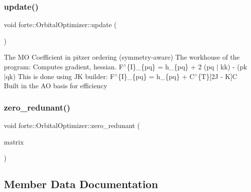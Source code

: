 \mbox{\label{classforte_1_1_orbital_optimizer_a575a256f93d9c3ca9d8eb388a9f51f79}} 
\subsubsection{\texorpdfstring{update()}{update()}}
{\footnotesize\ttfamily void forte\+::\+Orbital\+Optimizer\+::update (\begin{DoxyParamCaption}{ }\end{DoxyParamCaption})}

The MO Coefficient in pitzer ordering (symmetry-\/aware) The workhouse of the program\+: Computes gradient, hessian. F$^\wedge$\{I\}\+\_\+\{pq\} = h\+\_\+\{pq\} + 2 (pq $\vert$ kk) -\/ (pk $\vert$qk) This is done using JK builder\+: F$^\wedge$\{I\}\+\_\+\{pq\} = h\+\_\+\{pq\} + C$^\wedge$\{T\}\mbox{[}2J -\/ K\mbox{]}C Built in the AO basis for efficiency \mbox{\label{classforte_1_1_orbital_optimizer_a7f79e499361da4bc0d4b90187033d38f}} 
\subsubsection{\texorpdfstring{zero\+\_\+redunant()}{zero\_redunant()}}
{\footnotesize\ttfamily void forte\+::\+Orbital\+Optimizer\+::zero\+\_\+redunant (\begin{DoxyParamCaption}\item[{psi\+::\+Shared\+Matrix \&}]{matrix }\end{DoxyParamCaption})\hspace{0.3cm}{\ttfamily [protected]}}



\subsection{Member Data Documentation}
\mbox{\label{classforte_1_1_orbital_optimizer_a09ced43769a9cd379b3ec4a0cd5be430}} 
